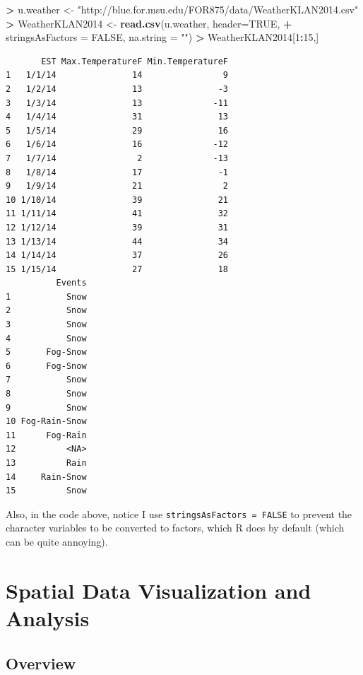 \documentclass[]{krantz}
\makeatletter
\newenvironment{Shaded}{\begin{snugshade}}{\end{snugshade}}
\newcommand{\KeywordTok}[1]{\textcolor[rgb]{0.27,0.27,0.27}{\textbf{#1}}}
\newcommand{\DataTypeTok}[1]{\textcolor[rgb]{0.27,0.27,0.27}{#1}}
\newcommand{\DecValTok}[1]{\textcolor[rgb]{0.06,0.06,0.06}{#1}}
\newcommand{\StringTok}[1]{\textcolor[rgb]{0.5,0.5,0.5}{#1}}
\newcommand{\OtherTok}[1]{\textcolor[rgb]{0.37,0.37,0.37}{#1}}
\newcommand{\OperatorTok}[1]{\textcolor[rgb]{0.43,0.43,0.43}{\textbf{#1}}}
\newcommand{\NormalTok}[1]{#1}
\newenvironment{kframe}{%
\medskip{}
\setlength{\fboxsep}{.8em}
 \def\at@end@of@kframe{}%
 \ifinner\ifhmode%
  \def\at@end@of@kframe{\end{minipage}}%
  \begin{minipage}{\columnwidth}%
 \fi\fi%
 \def\FrameCommand##1{\hskip\@totalleftmargin \hskip-\fboxsep
 \colorbox{shadecolor}{##1}\hskip-\fboxsep
     \hskip-\linewidth \hskip-\@totalleftmargin \hskip\columnwidth}%
 \MakeFramed {\advance\hsize-\width
   \@totalleftmargin\z@ \linewidth\hsize
   \@setminipage}}%
 {\par\unskip\endMakeFramed%
 \at@end@of@kframe}
\renewenvironment{Shaded}{\begin{kframe}}{\end{kframe}}
\theoremstyle{definition}
\theoremstyle{definition}
\theoremstyle{definition}
\theoremstyle{remark}
\makeatother
\begin{document}
\begin{Shaded}
\begin{Highlighting}[]
\OperatorTok{>}\StringTok{ }\NormalTok{u.weather <-}\StringTok{ "http://blue.for.msu.edu/FOR875/data/WeatherKLAN2014.csv"}
\OperatorTok{>}\StringTok{ }\NormalTok{WeatherKLAN2014 <-}\StringTok{ }\KeywordTok{read.csv}\NormalTok{(u.weather, }\DataTypeTok{header=}\OtherTok{TRUE}\NormalTok{, }
\OperatorTok{+}\StringTok{                             }\DataTypeTok{stringsAsFactors =} \OtherTok{FALSE}\NormalTok{, }\DataTypeTok{na.string =} \StringTok{""}\NormalTok{)}
\OperatorTok{>}\StringTok{ }\NormalTok{WeatherKLAN2014[}\DecValTok{1}\OperatorTok{:}\DecValTok{15}\NormalTok{,]}
\end{Highlighting}
\end{Shaded}

\begin{verbatim}
       EST Max.TemperatureF Min.TemperatureF
1   1/1/14               14                9
2   1/2/14               13               -3
3   1/3/14               13              -11
4   1/4/14               31               13
5   1/5/14               29               16
6   1/6/14               16              -12
7   1/7/14                2              -13
8   1/8/14               17               -1
9   1/9/14               21                2
10 1/10/14               39               21
11 1/11/14               41               32
12 1/12/14               39               31
13 1/13/14               44               34
14 1/14/14               37               26
15 1/15/14               27               18
          Events
1           Snow
2           Snow
3           Snow
4           Snow
5       Fog-Snow
6       Fog-Snow
7           Snow
8           Snow
9           Snow
10 Fog-Rain-Snow
11      Fog-Rain
12          <NA>
13          Rain
14     Rain-Snow
15          Snow
\end{verbatim}

Also, in the code above, notice I use
\texttt{stringsAsFactors\ =\ FALSE} to prevent the character variables
to be converted to factors, which R does by default (which can be quite
annoying).

\chapter{Spatial Data Visualization and
Analysis}\label{spatial-data-visualization-and-analysis}

\section{Overview}\label{overview}
\end{document}
